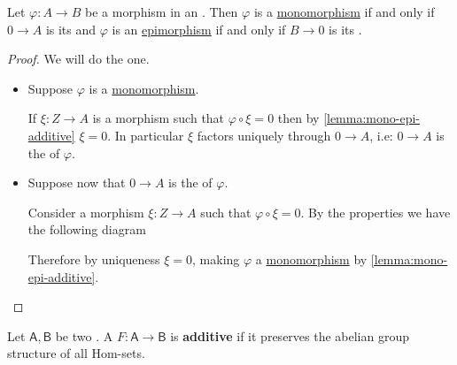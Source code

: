 \documentclass[../../main]{subfiles}
\begin{document}
\begin{lemma} \label{lemma:partial-sequence-additive}
  Let \(\varphi: A \to B\) be a morphism in an . Then \(\varphi\) is a \hyperref[def:mono-epi-morphism]{monomorphism} if and only if \(0 \to A\) is its  and \(\varphi\) is an \hyperref[def:mono-epi-morphism]{epimorphism} if and only if \(B \to 0\) is its .
\end{lemma}
\begin{proof}
  We will do the  one.
  \begin{itemize}
    \item[\(\implies\)] Suppose \(\varphi\) is a \hyperref[def:mono-epi-morphism]{monomorphism}.

          If \(\xi: Z \to A\) is a morphism such that \(\varphi \circ \xi = 0\) then by \autoref{lemma:mono-epi-additive} \(\xi = 0\).
          In particular \(\xi\) factors uniquely through \(0 \to A\), i.e: \(0 \to A\) is the  of \(\varphi\).
    \item[\(\impliedby\)] Suppose now that \(0 \to A\) is the  of \(\varphi\).

          Consider a morphism \(\xi: Z \to A\) such that \(\varphi \circ \xi = 0\).
          By the  properties we have the following diagram
          \begin{center}
          \end{center}
          Therefore by uniqueness \(\xi = 0\), making \(\varphi\) a \hyperref[def:mono-epi-morphism]{monomorphism} by \autoref{lemma:mono-epi-additive}.
  \end{itemize}
\end{proof}

\begin{definition} \label{def:additive-functor}
  Let \(\mathsf{A}, \mathsf{B}\) be two . A  \(F: \mathsf{A} \to \mathsf{B}\) is \textbf{additive} if it preserves the abelian group structure of all Hom-sets.
\end{definition}
\end{document}
